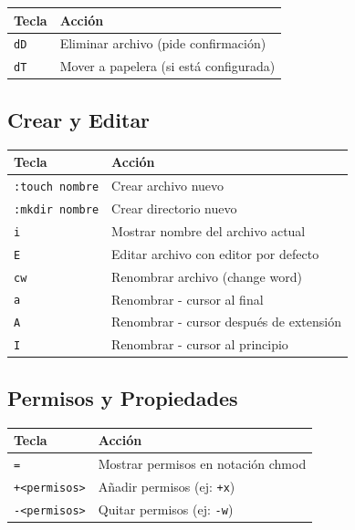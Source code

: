 \documentclass[
  doc,
  floatsintext,
  longtable,
  a4paper,
  nolmodern,
  notxfonts,
  notimes,
  12pt,
  colorlinks=true,linkcolor=blue,citecolor=blue,urlcolor=blue]{apa7}
\newcounter{none} %
\begin{document}
{\def\LTcaptype{none} %
\begin{longtable}[]{@{}ll@{}}
\toprule\noalign{}
Tecla & Acción \\
\midrule\noalign{}
\endhead
\bottomrule\noalign{}
\endlastfoot
\texttt{dD} & Eliminar archivo (pide confirmación) \\
\texttt{dT} & Mover a papelera (si está configurada) \\
\end{longtable}
}

\subsection{Crear y Editar}\label{crear-y-editar}

{\def\LTcaptype{none} %
\begin{longtable}[]{@{}ll@{}}
\toprule\noalign{}
Tecla & Acción \\
\midrule\noalign{}
\endhead
\bottomrule\noalign{}
\endlastfoot
\texttt{:touch\ nombre} & Crear archivo nuevo \\
\texttt{:mkdir\ nombre} & Crear directorio nuevo \\
\texttt{i} & Mostrar nombre del archivo actual \\
\texttt{E} & Editar archivo con editor por defecto \\
\texttt{cw} & Renombrar archivo (change word) \\
\texttt{a} & Renombrar - cursor al final \\
\texttt{A} & Renombrar - cursor después de extensión \\
\texttt{I} & Renombrar - cursor al principio \\
\end{longtable}
}

\subsection{Permisos y Propiedades}\label{permisos-y-propiedades}

{\def\LTcaptype{none} %
\begin{longtable}[]{@{}ll@{}}
\toprule\noalign{}
Tecla & Acción \\
\midrule\noalign{}
\endhead
\bottomrule\noalign{}
\endlastfoot
\texttt{=} & Mostrar permisos en notación chmod \\
\texttt{+\textless{}permisos\textgreater{}} & Añadir permisos (ej:
\texttt{+x}) \\
\texttt{-\textless{}permisos\textgreater{}} & Quitar permisos (ej:
\texttt{-w}) \\
\end{longtable}
}
\end{document}

